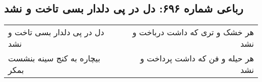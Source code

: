 \begin{center}
\section*{رباعی شماره ۶۹۶: دل در پی دلدار بسی تاخت و نشد}
\label{sec:0696}
\begin{longtable}{l p{0.5cm} r}
دل در پی دلدار بسی تاخت و نشد
&&
هر خشک و تری که داشت درباخت و نشد
\\
بیچاره به کنج سینه بنشست بمکر
&&
هر حیله و فن که داشت پرداخت و نشد
\\
\end{longtable}
\end{center}
